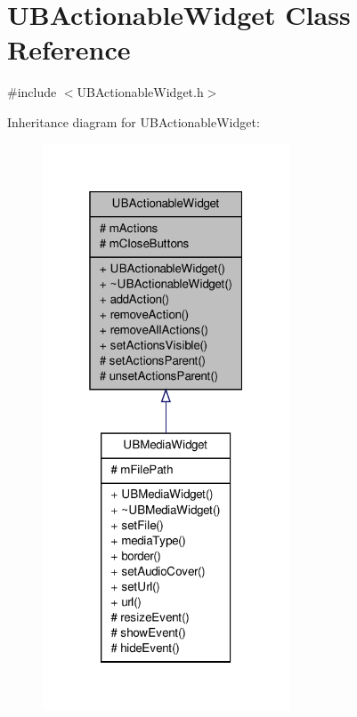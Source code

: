\hypertarget{class_u_b_actionable_widget}{\section{U\-B\-Actionable\-Widget Class Reference}
\label{da/d07/class_u_b_actionable_widget}
}


{\ttfamily \#include $<$U\-B\-Actionable\-Widget.\-h$>$}



Inheritance diagram for U\-B\-Actionable\-Widget\-:
\nopagebreak
\begin{figure}[H]
\begin{center}
\leavevmode
\includegraphics[width=208pt]{d6/d91/class_u_b_actionable_widget__inherit__graph}
\end{center}
\end{figure}


